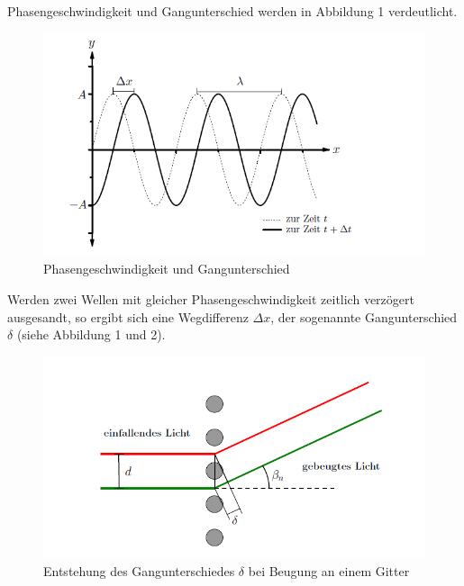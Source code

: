 \documentclass[12pt,a4paper,titlepage,headinclude,bibtotoc]{scrartcl}
\begin{document}
Phasengeschwindigkeit und Gangunterschied werden in Abbildung 1 verdeutlicht.

\begin{figure} [h]
\begin{center}
\includegraphics[scale=0.75]{Phasengeschwindigkeit2.png} \end{center}
\caption{Phasengeschwindigkeit und Gangunterschied}
\end{figure}

Werden zwei Wellen mit gleicher Phasengeschwindigkeit zeitlich verzögert ausgesandt, so ergibt sich eine Wegdifferenz $\Delta x$, der sogenannte Gangunterschied $\delta$  (siehe Abbildung 1 und 2). 

\begin{figure} [h!]
\begin{center}
\includegraphics[scale=0.65]{Gangunterschied.png} \end{center}
\caption{Entstehung des Gangunterschiedes $\delta$ bei Beugung an einem Gitter}
\end{figure}

\vspace{2 cm}
\end{document}
